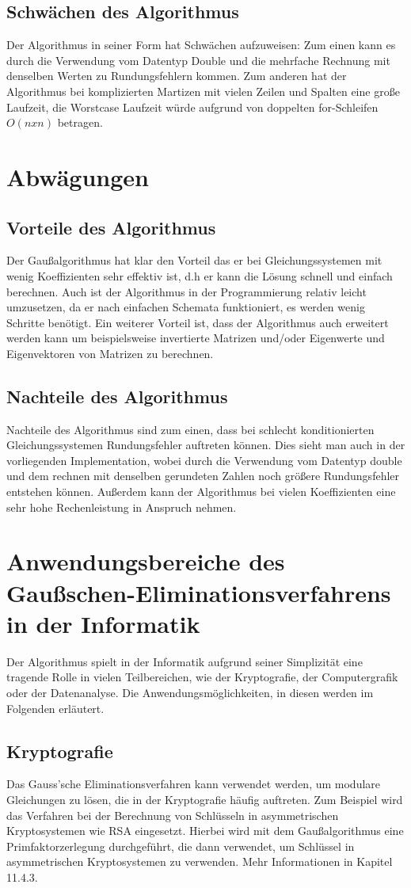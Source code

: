 \documentclass[a4paper, 12pt]{report}
\begin{document}
\begin{sloppypar}
\section{Schwächen des Algorithmus}
Der Algorithmus in seiner Form hat Schwächen aufzuweisen:
Zum einen kann es durch die Verwendung vom Datentyp Double und die mehrfache Rechnung mit denselben Werten zu Rundungsfehlern kommen.
Zum anderen hat der Algorithmus bei komplizierten Martizen mit vielen Zeilen und Spalten eine große Laufzeit, die Worstcase Laufzeit würde aufgrund von doppelten for-Schleifen $ O(n x n) $ betragen.
\chapter{Abwägungen}
\section{Vorteile des Algorithmus}
Der Gaußalgorithmus hat klar den Vorteil das er bei Gleichungssystemen mit wenig Koeffizienten sehr effektiv ist, d.h er kann die Lösung schnell und einfach berechnen.
Auch ist der Algorithmus in der Programmierung relativ leicht umzusetzen, da er nach einfachen Schemata funktioniert, es werden wenig Schritte benötigt.
Ein weiterer Vorteil ist, dass der Algorithmus auch erweitert werden kann um beispielsweise invertierte Matrizen und/oder Eigenwerte und Eigenvektoren von Matrizen zu berechnen.
\section{Nachteile des Algorithmus}
Nachteile des Algorithmus sind zum einen, dass bei schlecht konditionierten Gleichungssystemen Rundungsfehler auftreten können.
Dies sieht man auch in der vorliegenden Implementation, wobei durch die Verwendung vom Datentyp double und dem rechnen mit denselben gerundeten Zahlen noch größere Rundungsfehler entstehen können.
Außerdem kann der Algorithmus bei vielen Koeffizienten eine
sehr hohe Rechenleistung in Anspruch nehmen.
\chapter{Anwendungsbereiche des Gaußschen-Eliminationsverfahrens in der Informatik}
Der Algorithmus spielt in der Informatik aufgrund seiner Simplizität eine tragende Rolle in vielen Teilbereichen, wie der Kryptografie, der Computergrafik oder der Datenanalyse. Die Anwendungsmöglichkeiten, in diesen werden im Folgenden erläutert.
\section{Kryptografie}
Das Gauss'sche Eliminationsverfahren kann verwendet werden, um modulare Gleichungen zu lösen, die in der Kryptografie häufig auftreten.
Zum Beispiel wird das Verfahren bei der Berechnung von Schlüsseln in asymmetrischen Kryptosystemen wie RSA eingesetzt. Hierbei wird mit dem Gaußalgorithmus eine Primfaktorzerlegung durchgeführt, die dann
verwendet, um Schlüssel in asymmetrischen Kryptosystemen zu verwenden. Mehr Informationen in \cite{3} Kapitel 11.4.3.


\end{sloppypar}
\end{document}
